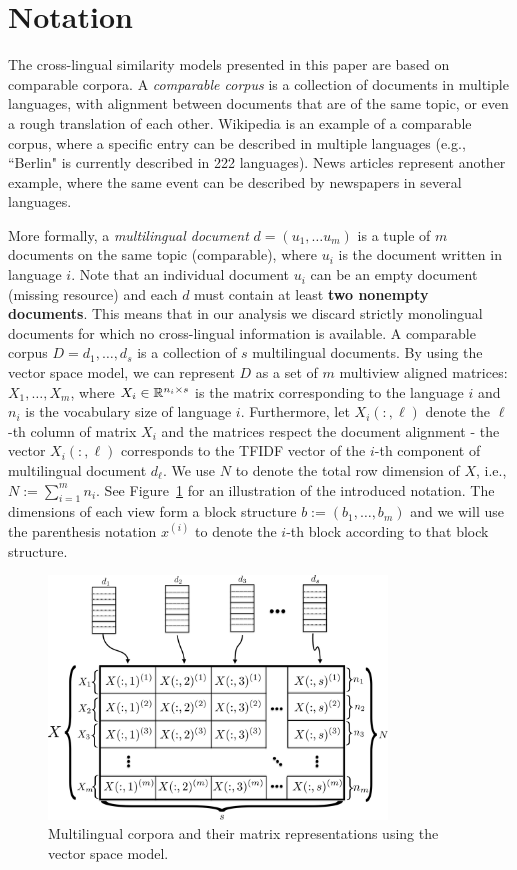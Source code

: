 \section{Notation}\label{chap:crosslingual:notation}

The cross-lingual similarity models presented in this paper are based on comparable corpora.
A \emph{comparable corpus} is a collection of documents in multiple languages, with alignment
between documents that are of the same topic, or even a rough translation of each other.
Wikipedia is an example of a comparable corpus, where a specific entry can be described in multiple
languages (e.g., ``Berlin" is currently described in 222 languages). News articles represent
another example, where the same event can be described by newspapers in several languages.

More formally, a \emph{multilingual document} $d = (u_1,\ldots u_m)$ is a tuple of $m$ documents
on the same topic (comparable), where $u_i$ is the document written in language $i$. Note that
an individual document $u_i$ can be an empty document (missing resource) and each $d$ must contain
at least \textbf{two nonempty documents}. This means that in our analysis we discard strictly
monolingual documents for which no cross-lingual information is available. A comparable corpus
$D = {d_1, \ldots, d_s}$ is a collection of $s$ multilingual documents. By using the vector space
model, we can represent $D$ as a set of $m$ multiview aligned matrices:
$X_1,\ldots,X_m$, where $X_i \in \mathbb{R}^{n_i \times s}$
is the matrix corresponding to the language $i$ and $n_i$ is the vocabulary size of language $i$.
Furthermore, let $X_i(:,\ell)$ denote the $\ell$-th column of matrix $X_i$ and the matrices respect
the document alignment - the vector $X_i(:,\ell)$ corresponds to the TFIDF vector of the $i$-th component
of multilingual document $d_\ell$. We use $N$ to denote the total row dimension of $X$, i.e.,
$N:= \sum_{i=1}^m n_i$. See Figure~\ref{fig:stacked_matrices} for an illustration of the introduced notation.
The dimensions of each view form a block structure $b := (b_1, \ldots, b_m)$ and we will use the parenthesis
notation $x^{(i)}$ to denote the $i$-th block according to that block structure.

\begin{figure}[tbp]
\centering
\includegraphics[width=9cm]{figures/stacked_matrices1-crop.pdf}
\caption[Multilingual corpus matrices]{Multilingual corpora and their matrix representations using the vector space model.}
\label{fig:stacked_matrices}
\end{figure}

